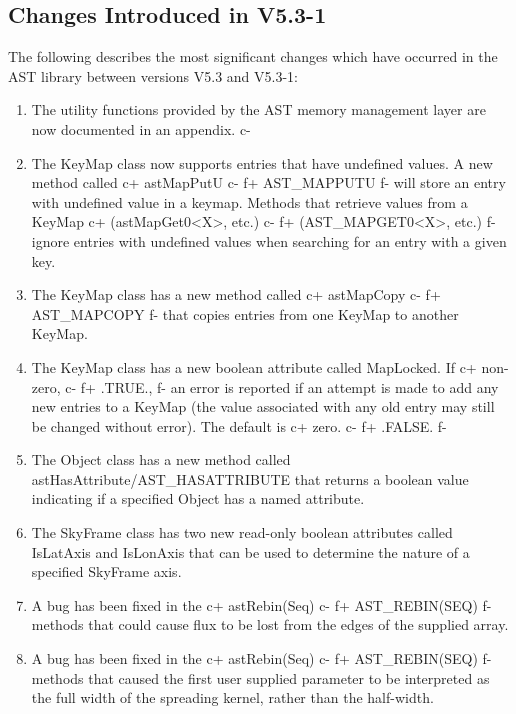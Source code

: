 \documentclass[twoside,11pt]{starlink}
\begin{document}
\subsection{Changes Introduced in V5.3-1}

The following describes the most significant changes which have
occurred in the AST library between versions V5.3 and V5.3-1:

\begin{enumerate}

c+
\item The utility functions provided by the AST memory management layer
are now documented in an appendix.
c-

\item The KeyMap class now supports entries that have undefined values. A
new method called
c+
astMapPutU
c-
f+
AST\_MAPPUTU
f-
will store an entry with undefined value in a keymap. Methods that
retrieve values from a KeyMap
c+
(astMapGet0<X>, etc.)
c-
f+
(AST\_MAPGET0<X>, etc.)
f-
ignore entries with undefined values when searching for an entry with a given
key.

\item The KeyMap class has a new method called
c+
astMapCopy
c-
f+
AST\_MAPCOPY
f-
that copies entries from one KeyMap to another KeyMap.

\item The KeyMap class has a new boolean attribute called MapLocked. If
c+
non-zero,
c-
f+
.TRUE.,
f-
an error is reported if an attempt is made to add any new entries
to a KeyMap (the value associated with any old entry may still be changed
without error). The default is
c+
zero.
c-
f+
.FALSE.
f-

\item The Object class has a new method called astHasAttribute/AST\_HASATTRIBUTE
that returns a boolean value indicating if a specified Object has a named
attribute.

\item The SkyFrame class has two new read-only boolean attributes called
IsLatAxis and IsLonAxis that can be used to determine the nature of a
specified SkyFrame axis.

\item A bug has been fixed in the
c+
astRebin(Seq)
c-
f+
AST\_REBIN(SEQ)
f-
methods that could cause flux to be lost from the edges of the supplied array.

\item A bug has been fixed in the
c+
astRebin(Seq)
c-
f+
AST\_REBIN(SEQ)
f-
methods that caused the first user supplied parameter to be interpreted as the
full width of the spreading kernel, rather than the half-width.


\end{enumerate}
\end{document}
